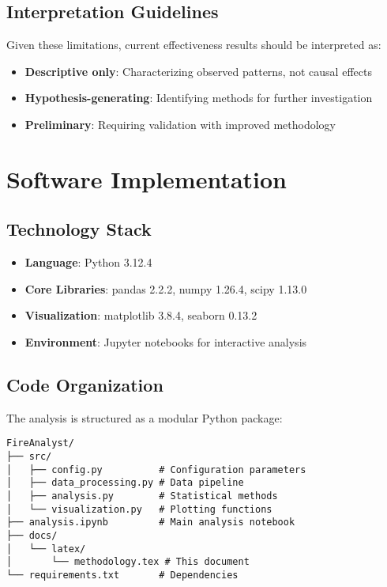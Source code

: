 \documentclass[12pt,a4paper]{article}
\begin{document}
\subsection{Interpretation Guidelines}

Given these limitations, current effectiveness results should be interpreted as:
\begin{itemize}
    \item \textbf{Descriptive only}: Characterizing observed patterns, not causal effects
    \item \textbf{Hypothesis-generating}: Identifying methods for further investigation
    \item \textbf{Preliminary}: Requiring validation with improved methodology
\end{itemize}

\section{Software Implementation}

\subsection{Technology Stack}

\begin{itemize}
    \item \textbf{Language}: Python 3.12.4
    \item \textbf{Core Libraries}: pandas 2.2.2, numpy 1.26.4, scipy 1.13.0
    \item \textbf{Visualization}: matplotlib 3.8.4, seaborn 0.13.2
    \item \textbf{Environment}: Jupyter notebooks for interactive analysis
\end{itemize}

\subsection{Code Organization}

The analysis is structured as a modular Python package:

\begin{verbatim}
FireAnalyst/
├── src/
│   ├── config.py          # Configuration parameters
│   ├── data_processing.py # Data pipeline
│   ├── analysis.py        # Statistical methods
│   └── visualization.py   # Plotting functions
├── analysis.ipynb         # Main analysis notebook
├── docs/
│   └── latex/
│       └── methodology.tex # This document
└── requirements.txt       # Dependencies
\end{verbatim}
\end{document}
